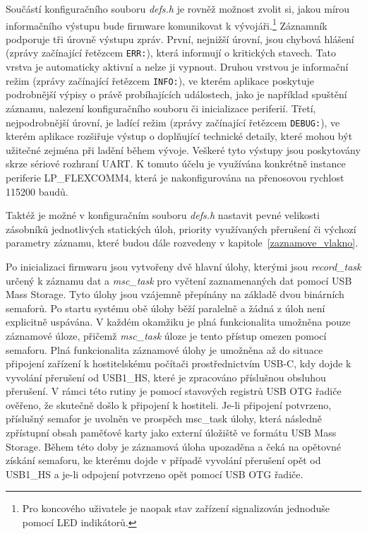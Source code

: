Součástí konfiguračního souboru \textit{defs.h} je rovněž možnost zvolit si, jakou mírou informačního výstupu bude firmware komunikovat k vývojáři.\footnote{Pro koncového uživatele je naopak stav zařízení signalizován jednoduše pomocí LED indikátorů.} Záznamník podporuje tři úrovně výstupu zpráv. První, nejnižší úrovní, jsou chybová hlášení (zprávy začínající řetězcem \texttt{ERR:}), která informují o kritických stavech. Tato vrstva je automaticky aktivní a nelze ji vypnout. Druhou vrstvou je informační režim (zprávy začínající řetězcem \texttt{INFO:}), ve kterém aplikace poskytuje podrobnější výpisy o právě probíhajících událostech, jako je například spuštění záznamu, nalezení konfiguračního souboru či inicializace periferií. Třetí, nejpodrobnější úrovní, je ladící režim (zprávy začínající řetězcem \texttt{DEBUG:}), ve kterém aplikace rozšiřuje výstup o doplňující technické detaily, které mohou být užitečné zejména při ladění během vývoje. Veškeré tyto výstupy jsou poskytovány skrze sériové rozhraní UART. K tomuto účelu je využívána konkrétně instance periferie LP\_FLEXCOMM4, která je nakonfigurována na přenosovou rychlost 115200 baudů. 

Taktéž je možné v konfiguračním souboru \textit{defs.h} nastavit pevné velikosti zásobníků jednotlivých statických úloh, priority využívaných přerušení či výchozí parametry záznamu, které budou dále rozvedeny v kapitole~\ref{zaznamove_vlakno}. 

Po inicializaci firmwaru jsou vytvořeny dvě hlavní úlohy, kterými jsou \textit{record\_task} určený k záznamu dat a \textit{msc\_task} pro vyčtení zaznamenaných dat pomocí USB Mass Storage. Tyto úlohy jsou vzájemně přepínány na základě dvou binárních semaforů. Po startu systému obě úlohy běží paralelně a žádná z úloh není explicitně uspávána. V každém okamžiku je plná funkcionalita umožněna pouze záznamové úloze, přičemž \textit{msc\_task} úloze je tento přístup omezen pomocí semaforu. Plná funkcionalita záznamové úlohy je umožněna až do situace připojení zařízení k hostitelskému počítači prostřednictvím USB-C, kdy dojde k vyvolání přerušení od USB1\_HS, které je zpracováno příslušnou obsluhou přerušení. V rámci této rutiny je pomocí stavových registrů USB OTG řadiče ověřeno, že skutečně došlo k připojení k hostiteli. Je-li připojení potvrzeno, příslušný semafor je uvolněn ve prospěch msc\_task úlohy, která následně zpřístupní obsah paměťové karty jako externí úložiště ve formátu USB Mass Storage. Během této doby je záznamová úloha upozaděna a čeká na opětovné získání semaforu, ke kterému dojde v případě vyvolání přerušení opět od USB1\_HS a je-li odpojení potvrzeno opět pomocí USB OTG řadiče. 

